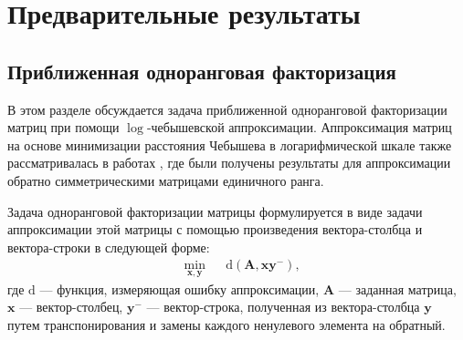 \documentclass[specialist,
               substylefile = spbu.rtx,
               subf,href,colorlinks=true, 12pt]{disser}
\theoremstyle{definition}
\begin{document}

\chapter{Предварительные результаты}
\label{chap:PF}
\section{Приближенная одноранговая факторизация}\label{sec:AROF}
В этом разделе обсуждается задача приближенной одноранговой факторизации матриц  при помощи $\log$-чебышевской аппроксимации.
Аппроксимация матриц на основе минимизации расстояния Чебышева в логарифмической шкале также рассматривалась в работах \cite{Krivulin2016Using,Krivulin2015Rating,Krivulin2017Application,Krivulin2019Tropical}, где были получены результаты для аппроксимации обратно симметрическими матрицами единичного ранга. %

Задача одноранговой факторизации матрицы формулируется в виде задачи аппроксимации этой матрицы с помощью произведения вектора-столбца и вектора-строки в следующей форме:
\begin{equation}\label{eq:factorization_without_sub}
\begin{aligned}
&
\min_{\bm{x},\bm{y}}
&&\mathrm{d}(\bm{A},\bm{x}\bm{y}^{-})
,
\end{aligned}
\end{equation}
где $\mathrm{d}$ --- функция, измеряющая ошибку аппроксимации, $\bm{A}$ --- заданная матрица, $\bm{x}$ --- вектор-столбец, $\bm{y}^{-}$ --- вектор-строка, полученная из вектора-столбца $\bm{y}$ путем транспонирования и замены каждого ненулевого элемента на обратный.
\end{document}
